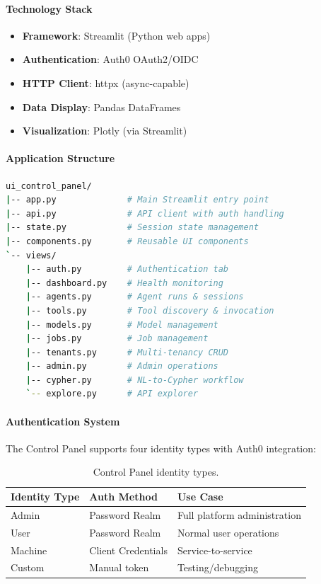 \paragraph{Technology Stack}
\begin{itemize}
    \item \textbf{Framework}: Streamlit (Python web apps)
    \item \textbf{Authentication}: Auth0 OAuth2/OIDC
    \item \textbf{HTTP Client}: httpx (async-capable)
    \item \textbf{Data Display}: Pandas DataFrames
    \item \textbf{Visualization}: Plotly (via Streamlit)
\end{itemize}

\paragraph{Application Structure}
\begin{lstlisting}[language=bash, caption={Control Panel directory structure.}]
ui_control_panel/
|-- app.py              # Main Streamlit entry point
|-- api.py              # API client with auth handling
|-- state.py            # Session state management
|-- components.py       # Reusable UI components
`-- views/
    |-- auth.py         # Authentication tab
    |-- dashboard.py    # Health monitoring
    |-- agents.py       # Agent runs & sessions
    |-- tools.py        # Tool discovery & invocation
    |-- models.py       # Model management
    |-- jobs.py         # Job management
    |-- tenants.py      # Multi-tenancy CRUD
    |-- admin.py        # Admin operations
    |-- cypher.py       # NL-to-Cypher workflow
    `-- explore.py      # API explorer
\end{lstlisting}

\paragraph{Authentication System}
The Control Panel supports four identity types with Auth0 integration:

\begin{table}[htbp]
    \centering
    \caption{Control Panel identity types.}
    \label{tab:control-panel-auth}
    \small
    \begin{tabular}{lll}
        \toprule
        \textbf{Identity Type} & \textbf{Auth Method} & \textbf{Use Case} \\
        \midrule
        Admin & Password Realm & Full platform administration \\
        User & Password Realm & Normal user operations \\
        Machine & Client Credentials & Service-to-service \\
        Custom & Manual token & Testing/debugging \\
        \bottomrule
    \end{tabular}
\end{table}

